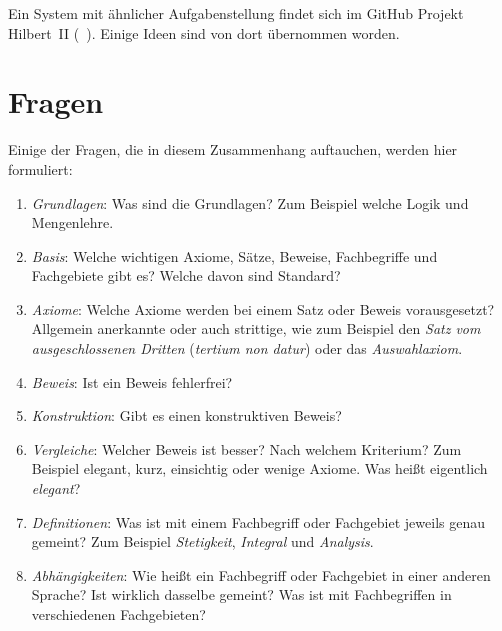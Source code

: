 \documentclass[english,ngerman,parskip=half,headsepline,footsepline]{scrreprt}
\newcommand*{\texthead}[1]{\textnormal{\textsf{\textbf{#1}}}}%
\newcommand{\Lohead}[1]{\lohead{\texthead{#1}}}
\newcommand{\Cohead}[1]{\cohead{\texthead{#1}}}
\newcommand{\Thispagestyle}{\thispagestyle{scrheadings}}
\newcommand*{\Sectionname}{\sectionname}%
\newcommand*{\nextsection}{%
}
\newcommand*{\newsection}[1]{%
	\markright{#1}
	\Cohead{\rightmark}
	\Lohead{\Sectionname~\thesection}
	\Thispagestyle%
}
\newcommand*{\sectionname}{Abschnitt}
\begin{document}
	Ein System mit ähnlicher Aufgabenstellung findet sich im GitHub Projekt Hilbert~II (\seename~\cite{bib:HilbertII, bib:qedeq}).
	Einige Ideen sind von dort übernommen worden.

	\nextsection
	\section{Fragen}%
	\newsection{Fragen}
	\label{sec:Fragen}

	Einige der Fragen, die in diesem Zusammenhang auftauchen, werden hier formuliert:

	\begin{enumerate}

		\item \label{Frage:Grundlagen} \emph{Grundlagen}: Was sind die Grundlagen? Zum Beispiel welche Logik und Mengenlehre.

		\item \label{Frage:Basis} \emph{Basis}: Welche wichtigen Axiome, Sätze, Beweise, Fachbegriffe und Fachgebiete gibt es? Welche davon sind Standard?

		\item \label{Frage:Axiome} \emph{Axiome}: Welche Axiome werden bei einem Satz oder Beweis vorausgesetzt? Allgemein anerkannte oder auch strittige, wie zum Beispiel den \emph{Satz vom ausgeschlossenen Dritten} (\emph{tertium non datur}) oder das \emph{Auswahlaxiom}.

		\item \label{Frage:Beweis} \emph{Beweis}: Ist ein Beweis fehlerfrei?

		\item \label{Frage:Konstruktion} \emph{Konstruktion}: Gibt es einen konstruktiven Beweis?

		\item \label{Frage:Vergleiche} \emph{Vergleiche}: Welcher Beweis ist besser? Nach welchem Kriterium? Zum Beispiel elegant, kurz, einsichtig oder wenige Axiome.
		Was heißt eigentlich \emph{elegant}?

		\item \label{Frage:Definitionen} \emph{Definitionen}: Was ist mit einem Fachbegriff oder Fachgebiet jeweils genau gemeint? Zum Beispiel \emph{Stetigkeit}, \emph{Integral} und \emph{Analysis}.

		\item \label{Frage:Abhängigkeiten} \emph{Abhängigkeiten}: Wie heißt ein Fachbegriff oder Fachgebiet in einer anderen Sprache? Ist wirklich dasselbe gemeint? Was ist mit Fachbegriffen in verschiedenen Fachgebieten?


\end{enumerate}
\end{document}
